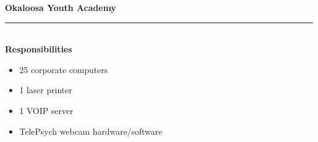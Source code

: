 \textbf{Okaloosa Youth Academy}%
\vspace{2pt}\hrule\hfill\\
\textbf{Responsibilities}
\begin{itemize}[leftmargin=*]
\item 25 corporate computers
\item 1 laser printer
\item 1 VOIP server
\item TelePsych webcam hardware/software
\end{itemize}